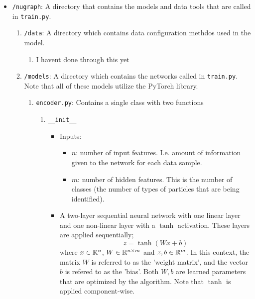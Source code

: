\begin{itemize}
    \item \texttt{/nugraph}: A directory that contains the models and data tools that are called in \texttt{train.py}.
        \begin{enumerate}
            \item \texttt{/data}: A directory which contains data configuration methdos used in the model.
                \begin{enumerate}
                    \item I havent done through this yet
                \end{enumerate}
            \item \texttt{/models}: A directory which contains the networks called in \texttt{train.py}. Note that all of these models utilize the PyTorch library.
                \begin{enumerate}
                    \item \texttt{encoder.py}: Contains a single class with two functions
                        \begin{enumerate}
                            \item \texttt{\_\_init\_\_}
                            \begin{itemize}
                                \item Inputs:
                                    \begin{itemize}
                                        \item $n$: number of input features. I.e. amount of information given to the network for each data sample.

                                        \item $m$: number of hidden features. This is the number of classes (the number of types of particles that are being identified).
                                    \end{itemize}

                                \item A  two-layer sequential neural network with one linear layer and one non-linear layer with a $\tanh$ activation. These layers are applied sequentially;
                                    \begin{equation}
                                        z = \tanh\left(Wx + b\right)
                                    \end{equation}
                                where $x\in \mathbb{R}^n$, $W\in \mathbb{R}^{n\times m}$ and $z, b\in \mathbb{R}^m$. In this context, the matrix $W$ is referred to as the 'weight matrix', and the vector $b$ is refered to as the 'bias'. Both $W, b$ are learned parameters that are optimized by the algorithm. Note that $\tanh$ is applied component-wise.



\end{itemize}
\end{enumerate}
\end{enumerate}
\end{enumerate}
\end{itemize}
